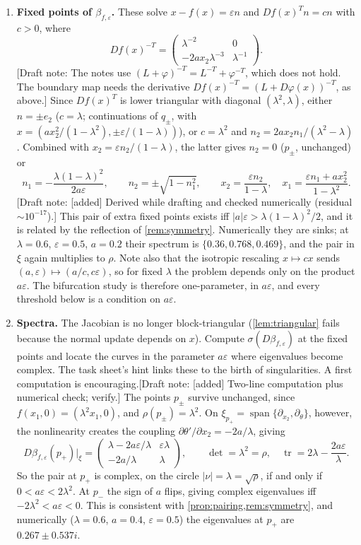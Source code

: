 \documentclass[11pt,a4paper]{article}
\newif\ifdraftnotes \draftnotestrue
\newcommand{\note}[1]{\ifdraftnotes{\color{BrickRed}\textsf{\footnotesize[Draft note: #1]}}\fi}
\theoremstyle{definition}
\theoremstyle{remark}
\newcommand{\eps}{\varepsilon}
\DeclareMathOperator{\spn}{span}
\begin{document}
\begin{enumerate}[label=\textbf{(\alph*)},leftmargin=*]
  \item \textbf{Fixed points of $\beta_{f,\eps}$.} These solve $x-f(x)=\eps n$ and $Df(x)^Tn=cn$ with $c>0$, where
  \[
    Df(x)^{-T}=\begin{pmatrix}\lambda^{-2}&0\\-2ax_2\lambda^{-3}&\lambda^{-1}\end{pmatrix}.
  \]
  \note{The notes use $(L+\varphi)^{-T}=L^{-T}+\varphi^{-T}$, which does not hold. The boundary map needs the derivative $Df(x)^{-T}=(L+D\varphi(x))^{-T}$, as above.}
  Since $Df(x)^T$ is lower triangular with diagonal $(\lambda^2,\lambda)$, either $n=\pm e_2$ ($c=\lambda$; continuations of $q_\pm$,
  with $x=(a x_2^2/(1-\lambda^2),\pm\eps/(1-\lambda))$), or $c=\lambda^2$ and $n_2=2ax_2n_1/(\lambda^2-\lambda)$. Combined with
  $x_2=\eps n_2/(1-\lambda)$, the latter gives $n_2=0$ ($p_\pm$, unchanged) or
  \[
    n_1=-\frac{\lambda(1-\lambda)^2}{2a\eps},\qquad n_2=\pm\sqrt{1-n_1^2},\qquad x_2=\frac{\eps n_2}{1-\lambda},\quad
    x_1=\frac{\eps n_1+ax_2^2}{1-\lambda^2}.
  \]
  \note{[added] Derived while drafting and checked numerically (residual $\sim10^{-17}$).}
  This pair of extra fixed points exists iff $|a|\eps>\lambda(1-\lambda)^2/2$, and it is related by the reflection of
  \cref{rem:symmetry}. Numerically they are sinks; at $\lambda=0.6$, $\eps=0.5$, $a=0.2$ their spectrum is
  $\{0.36,0.768,0.469\}$, and the pair in $\xi$ again multiplies to $\rho$. Note also that the isotropic rescaling
  $x\mapsto cx$ sends $(a,\eps)\mapsto(a/c,c\eps)$, so for fixed $\lambda$ the problem depends only on the product $a\eps$. The
  bifurcation study is therefore one-parameter, in $a\eps$, and every threshold below is a condition on $a\eps$.
  \item \textbf{Spectra.} The Jacobian is no longer block-triangular (\cref{lem:triangular} fails because the normal
  update depends on $x$). Compute $\sigma(D\beta_{f,\eps})$ at the fixed points and locate the curves in the
  parameter $a\eps$ where eigenvalues become complex. The task sheet's hint links these to the birth of singularities.
  A first computation is encouraging.\note{[added] Two-line computation plus numerical check; verify.} The points $p_\pm$
  survive unchanged, since $f(x_1,0)=(\lambda^2x_1,0)$, and $\rho(p_\pm)=\lambda^2$. On $\xi_{p_+}=\spn\{\partial_{x_2},\partial_\theta\}$,
  however, the nonlinearity creates the coupling $\partial\theta'/\partial x_2=-2a/\lambda$, giving
  \[
    D\beta_{f,\eps}(p_+)|_{\xi}=\begin{pmatrix}\lambda-2a\eps/\lambda & \eps\lambda\\ -2a/\lambda & \lambda\end{pmatrix},
    \qquad \det=\lambda^2=\rho,\quad \operatorname{tr}=2\lambda-\frac{2a\eps}{\lambda}.
  \]
  So the pair at $p_+$ is complex, on the circle $|\nu|=\lambda=\sqrt\rho$, if and only if $0<a\eps<2\lambda^2$. At $p_-$ the
  sign of $a$ flips, giving complex eigenvalues iff $-2\lambda^2<a\eps<0$. This is consistent with \cref{prop:pairing,rem:symmetry}, and
  numerically ($\lambda=0.6$, $a=0.4$, $\eps=0.5$) the eigenvalues at $p_+$ are $0.267\pm0.537i$.


\end{enumerate}
\end{document}
